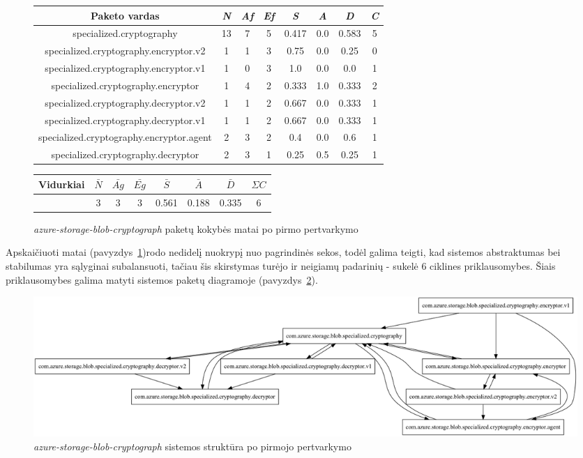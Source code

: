 \begin{figure}[H]
\begin{center}
    \begin{tabular}{|c|c|c|c|c|c|c|c|}
        \hline
        Paketo vardas & \textit{N} & \textit{Af} & \textit{Ef} & \textit{S} & \textit{A} & \textit{D} & \textit{C} \\ [0.5ex]
        \hline\hline
        specialized.cryptography & 13 & 7 & 5 & 0.417 & 0.0 & 0.583 & 5 \\
        \hline
        specialized.cryptography.encryptor.v2 & 1 & 1 & 3 & 0.75 & 0.0 & 0.25 & 0 \\
        \hline
        specialized.cryptography.encryptor.v1 & 1 & 0 & 3 & 1.0 & 0.0 & 0.0 & 1 \\
        \hline
        specialized.cryptography.encryptor & 1 & 4 & 2 & 0.333 & 1.0 & 0.333 & 2 \\
        \hline
        specialized.cryptography.decryptor.v2 & 1 & 1 & 2 & 0.667 & 0.0 & 0.333 & 1 \\
        \hline
        specialized.cryptography.decryptor.v1 & 1 & 1 & 2 & 0.667 & 0.0 & 0.333 & 1\\
        \hline
        specialized.cryptography.encryptor.agent & 2 & 3 & 2 & 0.4 & 0.0 & 0.6 & 1\\
        \hline
        specialized.cryptography.decryptor & 2 & 3 & 1 & 0.25 & 0.5 & 0.25 & 1 \\
        \hline
    \end{tabular}
    \begin{tabular}{|c|c|c|c|c|c|c|c|}
        \hline
        Vidurkiai & $\bar{N}$ & $\bar{Ag}$ & $\bar{Eg}$ & $\bar{S}$ & $\bar{A}$ & $\bar{D}$ & $\Sigma C$ \\ [0.5ex]
        \hline\hline
        & 3 & 3 & 3 & 0.561 & 0.188 & 0.335 & 6 \\
        \hline
    \end{tabular}
\end{center}
\caption{\textit{azure-storage-blob-cryptograph} paketų kokybės matai po pirmo pertvarkymo}
\label{table:matais}
\end{figure}
Apskaičiuoti matai (pavyzdys~\ref{table:matais})rodo nedidelį nuokrypį nuo pagrindinės sekos, todėl galima teigti, kad sistemos abstraktumas bei stabilumas
yra sąlyginai subalansuoti, tačiau šis skirstymas turėjo ir neigiamų padarinių - sukelė 6 ciklines priklausomybes.
Šiais priklausomybes galima matyti sistemos paketų diagramoje (pavyzdys~\ref{fig:azure_packages_v1}).
\begin{figure}[H]
    \centering
    \includegraphics[scale=0.3]{img/azure_packages_v1}
    \caption{\textit{azure-storage-blob-cryptograph} sistemos struktūra po pirmojo pertvarkymo}
    \label{fig:azure_packages_v1}
\end{figure}

